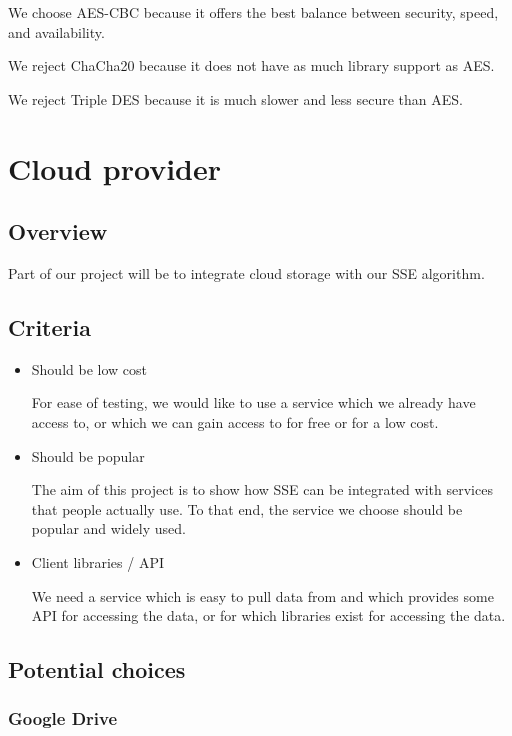 \documentclass[onecolumn, draftclsnofoot,10pt, compsoc]{IEEEtran}
\begin{document}
We choose AES-CBC because it offers the best balance between security, speed, and availability.

We reject ChaCha20 because it does not have as much library support as AES.

We reject Triple DES because it is much slower and less secure than AES.

\section{ Cloud provider }


\subsection{ Overview }

Part of our project will be to integrate cloud storage with our SSE algorithm.

\subsection{ Criteria }

\begin{itemize}
  \item Should be low cost

  For ease of testing, we would like to use a service which we already have access to, or which we can gain access to for free or for a low cost.

  \item Should be popular

  The aim of this project is to show how SSE can be integrated with services that people actually use. To that end, the service we choose should be popular and widely used.

  \item Client libraries / API

  We need a service which is easy to pull data from and which provides some API for accessing the data, or for which libraries exist for accessing the data.

\end{itemize}

\subsection{ Potential choices }
\subsubsection{ Google Drive }
\end{document}
